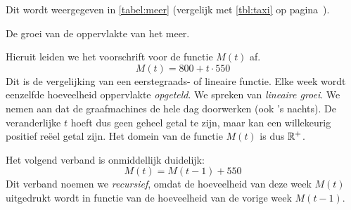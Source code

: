 Dit wordt weergegeven in \cref{tabel:meer} (vergelijk met \cref{tbl:taxi} op pagina~\pageref{tbl:taxi}).
 \begin{table}[htb]
    \centering
    \vspace{0.3cm}
        \caption{De groei van de oppervlakte  van het meer.}
\label{tabel:meer}
 \end{table}
 
\noindent
Hieruit leiden we  het voorschrift voor de functie $M(t)$ af.
\begin{displaymath}
    M(t)=800+t\cdot 550
\end{displaymath}
Dit is de vergelijking van  een eerstegraads- of lineaire functie. Elke week wordt  eenzelfde hoeveelheid oppervlakte \emph{opgeteld}. We spreken van \emph{lineaire groei}. We nemen aan dat de graafmachines de hele dag doorwerken (ook 's nachts). De veranderlijke $t$ hoeft dus geen geheel getal te zijn, maar kan een willekeurig positief reëel getal zijn. Het domein van de functie $M(t)$ is dus $\mathbb{R}^+$. 


Het volgend verband is onmiddellijk duidelijk:
\begin{displaymath}
    M(t)=M(t-1) +550
\end{displaymath}
 Dit verband noemen we \emph{recursief}, omdat de hoeveelheid van deze  week $M(t)$ uitgedrukt wordt in functie van de hoeveelheid van de vorige week $M(t-1)$.

